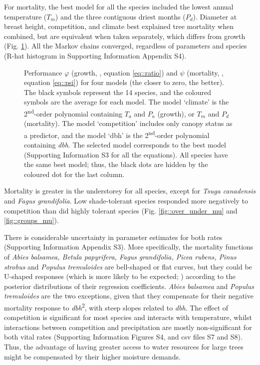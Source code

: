 For mortality, the best model for all the species included the lowest annual temperature ($ T_m $) and the three contiguous driest months ($ P_d $). Diameter at breast height, competition, and climate best explained tree mortality when combined, but are equivalent when taken separately, which differs from growth (Fig. \ref{fig::aic_waic}). All the Markov chains converged, regardless of parameters and species (R-hat histogram in Supporting Information Appendix S4). 
\begin{figure}
	\centering
	
	\caption{Performance $ \varphi $ (growth, \CircSteel, equation \ref{eq::ratio}) and $ \psi $ (mortality, \MoveUp, equation \ref{eq::psi}) for four models (the closer to zero, the better). The black symbols represent the 14 species, and the coloured symbols are the average for each model. The model `climate' is the 2\textsuperscript{nd}-order polynomial containing $ T_a $ and $ P_a $ (growth), or $ T_m $ and $ P_d $ (mortality). The model `competition' includes only canopy status as a predictor, and the model `dbh' is the 2\textsuperscript{nd}-order polynomial containing \textit{dbh}. The selected model corresponds to the best model (Supporting Information S3 for all the equations). All species have the same best model; thus, the black dots are hidden by the coloured dot for the last column. \label{fig::aic_waic}}
\end{figure}
Mortality is greater in the understorey for all species, except for \textit{Tsuga canadensis} and \textit{Fagus grandifolia}. Low shade-tolerant species responded more negatively to competition than did highly tolerant species (Fig. \ref{fig::over_under_mu} and \ref{fig::groups_mu}).

There is considerable uncertainty in parameter estimates for both rates (Supporting Information Appendix S3). More specifically, the mortality functions of \textit{Abies balsamea, Betula papyrifera, Fagus grandifolia, Picea rubens, Pinus strobus} and \textit{Populus tremuloides} are bell-shaped or flat curves, but they could be U-shaped responses (which is more likely to be expected; \citet{Lines2010}) according to the posterior distributions of their regression coefficients. \textit{Abies balsamea} and \textit{Populus tremuloides} are the two exceptions, given that they compensate for their negative mortality response to \textit{dbh}\textsuperscript{2}, with steep slopes related to \textit{dbh}. The effect of competition is significant for most species and interacts with temperature, whilst interactions between competition and precipitation are mostly non-significant for both vital rates (Supporting Information Figures S4, and csv files S7 and S8). Thus, the advantage of having greater access to water resources for large trees might be compensated by their higher moisture demands.

